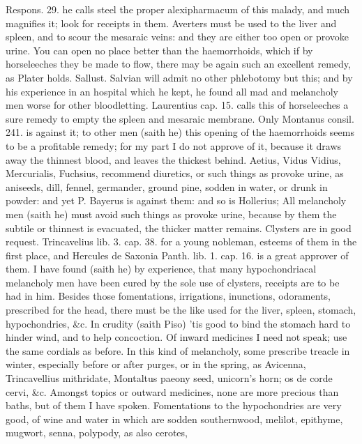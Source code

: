 Respons. 29. he calls steel the proper alexipharmacum of this
malady, and much magnifies it; look for receipts in them. Averters must
be used to the liver and spleen, and to scour the mesaraic veins: and
they are either too open or provoke urine. You can open no place better
than the haemorrhoids, which if by horseleeches they be made to flow,
there may be again such an excellent remedy, as Plater holds.
Sallust. Salvian will admit no other phlebotomy but this; and by his
experience in an hospital which he kept, he found all mad and
melancholy men worse for other bloodletting. Laurentius cap. 15. calls
this of horseleeches a sure remedy to empty the spleen and mesaraic
membrane. Only Montanus consil. 241. is against it;  to other men
(saith he) this opening of the haemorrhoids seems to be a profitable
remedy; for my part I do not approve of it, because it draws away the
thinnest blood, and leaves the thickest behind.
Aetius, Vidus Vidius, Mercurialis, Fuchsius, recommend diuretics, or
such things as provoke urine, as aniseeds, dill, fennel, germander,
ground pine, sodden in water, or drunk in powder: and yet P.
Bayerus is against them: and so is Hollerius; All melancholy men (saith
he) must avoid such things as provoke urine, because by them the
subtile or thinnest is evacuated, the thicker matter remains.
Clysters are in good request. Trincavelius lib. 3. cap. 38. for a young
nobleman, esteems of them in the first place, and Hercules de Saxonia
Panth. lib. 1. cap. 16. is a great approver of them. I have found
(saith he) by experience, that many hypochondriacal melancholy men have
been cured by the sole use of clysters, receipts are to be had in him.
Besides those fomentations, irrigations, inunctions, odoraments,
prescribed for the head, there must be the like used for the liver,
spleen, stomach, hypochondries, \&c. In crudity (saith Piso) 'tis
good to bind the stomach hard to hinder wind, and to help concoction.
Of inward medicines I need not speak; use the same cordials as before.
In this kind of melancholy, some prescribe treacle in winter,
especially before or after purges, or in the spring, as Avicenna,
 Trincavellius mithridate, Montaltus paeony seed, unicorn's
horn; os de corde cervi, \&c.
Amongst topics or outward medicines, none are more precious than baths,
but of them I have spoken. Fomentations to the hypochondries are very
good, of wine and water in which are sodden southernwood, melilot,
epithyme, mugwort, senna, polypody, as also cerotes,
